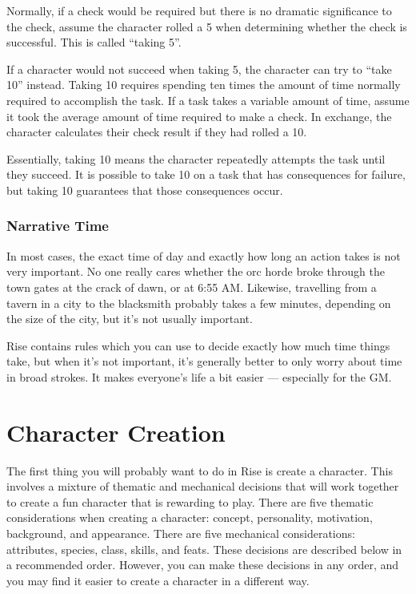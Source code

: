             \label{Taking 5}
            Normally, if a check would be required but there is no dramatic significance to the check, assume the character rolled a 5 when determining whether the check is successful.
            This is called ``taking 5''.

            \label{Taking 10}
            If a character would not succeed when taking 5, the character can try to ``take 10'' instead.
            Taking 10 requires spending ten times the amount of time normally required to accomplish the task.
            If a task takes a variable amount of time, assume it took the average amount of time required to make a check.
            In exchange, the character calculates their check result if they had rolled a 10.

            Essentially, taking 10 means the character repeatedly attempts the task until they succeed.
            It is possible to take 10 on a task that has consequences for failure, but taking 10 guarantees that those consequences occur.

        \subsubsection{Narrative Time}
            In most cases, the exact time of day and exactly how long an action takes is not very important.
            No one really cares whether the orc horde broke through the town gates at the crack of dawn, or at 6:55 AM\@.
            Likewise, travelling from a tavern in a city to the blacksmith probably takes a few minutes, depending on the size of the city, but it's not usually important.

            Rise contains rules which you can use to decide exactly how much time things take, but when it's not important, it's generally better to only worry about time in broad strokes.
            It makes everyone's life a bit easier --- especially for the GM\@.

\section{Character Creation}

    The first thing you will probably want to do in Rise is create a character.
    This involves a mixture of thematic and mechanical decisions that will work together to create a fun character that is rewarding to play.
    There are five thematic considerations when creating a character: concept, personality, motivation, background, and appearance.
    There are five mechanical considerations: attributes, species, class, skills, and feats.
    These decisions are described below in a recommended order.
    However, you can make these decisions in any order, and you may find it easier to create a character in a different way.  

